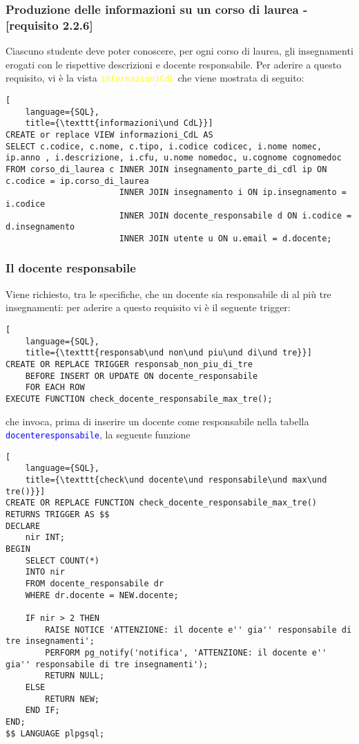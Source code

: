 \documentclass{article}
\newcommand{\tabb}[1]{\texttt{\textcolor{blue}{#1}}}
\newcommand{\sqlview}[1]{\texttt{\textcolor{yellow}{#1}}}
\newcommand{\und}[0]{\textunderscore}
\begin{document}
\subsubsection{Produzione delle informazioni su un corso di laurea - [requisito 2.2.6]}
Ciascuno studente deve poter conoscere, per ogni corso di laurea, gli insegnamenti erogati con le rispettive descrizioni e docente responsabile. Per aderire a questo requisito, vi è la vista \sqlview{informazioni\und CdL} che viene mostrata di seguito:
\begin{lstlisting}[
    language={SQL},
    title={\texttt{informazioni\und CdL}}]
CREATE or replace VIEW informazioni_CdL AS
SELECT c.codice, c.nome, c.tipo, i.codice codicec, i.nome nomec, ip.anno , i.descrizione, i.cfu, u.nome nomedoc, u.cognome cognomedoc
FROM corso_di_laurea c INNER JOIN insegnamento_parte_di_cdl ip ON c.codice = ip.corso_di_laurea
                       INNER JOIN insegnamento i ON ip.insegnamento = i.codice
                       INNER JOIN docente_responsabile d ON i.codice = d.insegnamento
                       INNER JOIN utente u ON u.email = d.docente;
\end{lstlisting}


\subsubsection{Il docente responsabile}
Viene richiesto, tra le specifiche, che un docente sia responsabile di al più tre insegnamenti: per aderire a questo requisito vi è il seguente trigger:

\begin{lstlisting}[
    language={SQL},
    title={\texttt{responsab\und non\und piu\und di\und tre}}]
CREATE OR REPLACE TRIGGER responsab_non_piu_di_tre
    BEFORE INSERT OR UPDATE ON docente_responsabile
    FOR EACH ROW
EXECUTE FUNCTION check_docente_responsabile_max_tre();
\end{lstlisting}

che invoca, prima di inserire un docente come responsabile nella tabella \tabb{docente\und responsabile}, la seguente funzione

\begin{lstlisting}[
    language={SQL},
    title={\texttt{check\und docente\und responsabile\und max\und tre()}}]
CREATE OR REPLACE FUNCTION check_docente_responsabile_max_tre() RETURNS TRIGGER AS $$
DECLARE
    nir INT;
BEGIN
    SELECT COUNT(*)
    INTO nir
    FROM docente_responsabile dr
    WHERE dr.docente = NEW.docente;

    IF nir > 2 THEN
        RAISE NOTICE 'ATTENZIONE: il docente e'' gia'' responsabile di tre insegnamenti';
        PERFORM pg_notify('notifica', 'ATTENZIONE: il docente e'' gia'' responsabile di tre insegnamenti');
        RETURN NULL;
    ELSE
        RETURN NEW;
    END IF;
END;
$$ LANGUAGE plpgsql;
\end{lstlisting}
\end{document}

